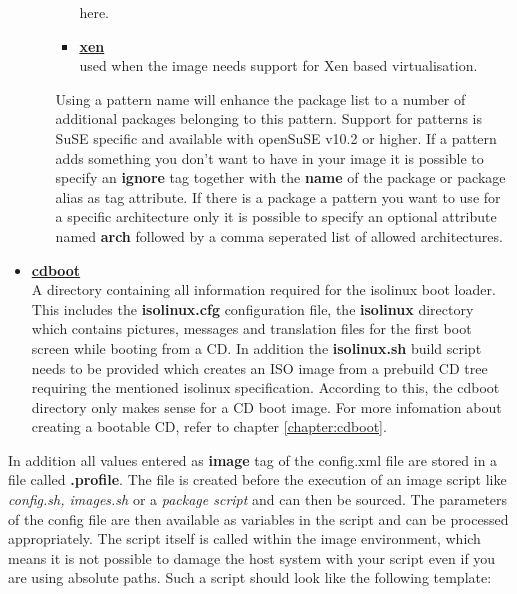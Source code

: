 \begin{itemize}
\begin{enumerate}
\begin{itemize}
                      here.
                \item \textbf{\underline{xen}}\\
                      used when the image needs support for Xen based
                      virtualisation.
                \end{itemize}
				Using a pattern name will enhance the package list to
				a number of additional packages belonging to this pattern.
				Support for patterns is SuSE specific and available with
				openSuSE v10.2 or higher. If a pattern adds something you
                don't want to have in your image it is possible to specify
                an \textbf{ignore} tag together with the \textbf{name} of the
                package or package alias as tag attribute. If there is a
                package a pattern you want to use for a specific architecture
                only it is possible to specify an optional attribute named
                \textbf{arch} followed by a comma seperated list of allowed
                architectures.
      \end{enumerate}
\item \textbf{\underline{cdboot}}\\
A directory containing all information required for the isolinux
boot loader. This includes the \textbf{isolinux.cfg} configuration
file, the \textbf{isolinux} directory which contains pictures, messages and
translation files for the first boot screen while booting from a CD.
In addition the \textbf{isolinux.sh} build script needs to be provided
which creates an ISO image from a prebuild CD tree requiring the mentioned
isolinux specification. According to this, the cdboot directory
only makes sense for a CD boot image. For more infomation about creating
a bootable CD, refer to chapter \ref{chapter:cdboot}.
\end{itemize}

In addition all values entered as \textbf{image} tag of the config.xml
file are stored in a file called \textbf{.profile}. The file is created
before the execution of an image script like \textit{config.sh, images.sh}
or a \textit{package script} and can then be sourced. The parameters
of the config file are then available as variables in the
script and can be processed appropriately. The script itself is called
within the image environment, which means it
is not possible to damage the host system with your script even if you
are using absolute paths. Such a script should look like the following
template:

